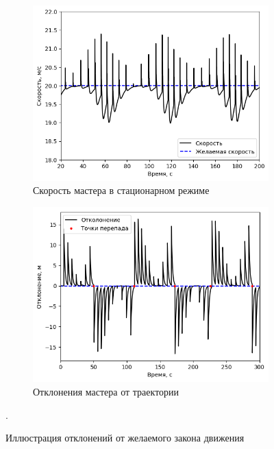 \documentclass[12pt,a4paper]{article}
\begin{document}
\begin{figure}[!htbp]
	\centering
	\begin{subfigure}{.5\textwidth}
		\centering
		\includegraphics[width=1\linewidth]{master-trajectory-1-velocity.png}
		\caption{Скорость мастера в стационарном режиме}
		\label{fig:error-master-1}
	\end{subfigure}%
	\begin{subfigure}{.5\textwidth}
		\centering
		\includegraphics[width=1\linewidth]{master-trajectory-error.png}
		\caption{Отклонения мастера от траектории}
		\label{fig:error-master-2}
	\end{subfigure}
	\caption{Иллюстрация отклонений от желаемого закона движения}.
	\label{fig:errors-master}
\end{figure}
\end{document}
